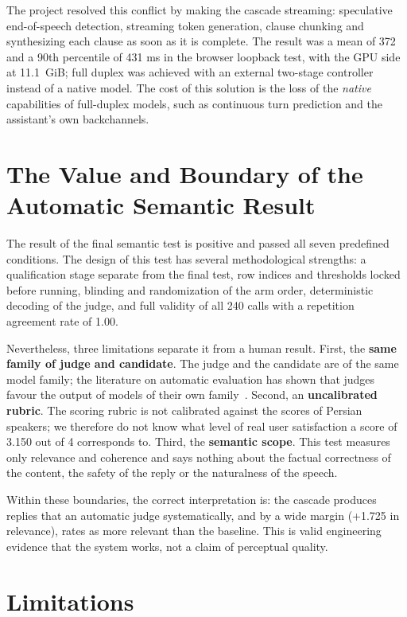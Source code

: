 The project resolved this conflict by making the cascade streaming: speculative end-of-speech
detection, streaming token generation, clause chunking and synthesizing each clause as soon as
it is complete. The result was a mean of 372 and a 90th percentile of 431 ms in the browser
loopback test, with the GPU side at 11.1~GiB; full duplex was achieved with an external
two-stage controller instead of a native model. The cost of this solution is the loss of the
\emph{native} capabilities of full-duplex models, such as continuous turn prediction and the
assistant's own backchannels.

\section{The Value and Boundary of the Automatic Semantic Result}
\label{sec:disc-judge}

The result of the final semantic test is positive and passed all seven predefined conditions.
The design of this test has several methodological strengths: a qualification stage separate from
the final test, row indices and thresholds locked before running, blinding and randomization of
the arm order, deterministic decoding of the judge, and full validity of all 240 calls with a
repetition agreement rate of 1.00.

Nevertheless, three limitations separate it from a human result. First, the \textbf{same family
of judge and candidate}. The judge and the candidate are of the same model family; the literature
on automatic evaluation has shown that judges favour the output of models of their own
family~\cite{zheng2023mtbench}. Second, an \textbf{uncalibrated rubric}. The scoring rubric is not
calibrated against the scores of Persian speakers; we therefore do not know what level of real
user satisfaction a score of 3.150 out of 4 corresponds to. Third, the \textbf{semantic scope}. This
test measures only relevance and coherence and says nothing about the factual correctness of the
content, the safety of the reply or the naturalness of the speech.

Within these boundaries, the correct interpretation is: the cascade produces replies that an
automatic judge systematically, and by a wide margin (+1.725 in relevance), rates as more
relevant than the baseline. This is valid engineering evidence that the system works, not a
claim of perceptual quality.

\section{Limitations}
\label{sec:limitations}

